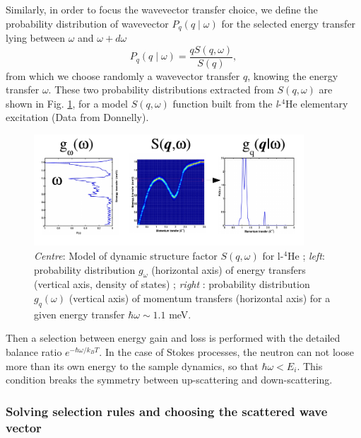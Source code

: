 Similarly, in order to focus the wavevector transfer choice, we define the probability distribution of wavevector $P_q(q\mid\omega)$ for the selected energy transfer lying between $\omega$ and $\omega+d\omega$
\begin{equation}
P_q(q\mid\omega) = \frac{q S(q, \omega)}{S(q)},
\end{equation}
from which we choose randomly a wavevector transfer $q$, knowing the energy transfer $\omega$.
These two probability distributions extracted from $S(q,\omega)$ are shown in Fig. \ref{f:isotropic-sqw-proba}, for a model $S(q,\omega)$ function built from the \textit{l}-$^4$He elementary excitation (Data from Donnelly).

\begin{figure}
  \begin{center}
    \includegraphics[width=0.9\textwidth]{figures/Sqw_sampling}
  \end{center}
\caption{\emph{Centre}: Model of dynamic structure factor $S(q,\omega)$ for l-$^4$He ; \emph{left}: probability distribution $g_\omega$ (horizontal axis) of energy transfers (vertical axis, density of states) ; \emph{right} : probability distribution $g_q(\omega)$ (vertical axis) of momentum transfers (horizontal axis) for a given energy transfer $\hbar \omega \sim 1.1$ meV.}
\label{f:isotropic-sqw-proba}
\end{figure}

Then a selection between energy gain and loss is performed with the detailed balance ratio $e^{-\hbar \omega / k_B T}$. In the case of Stokes processes, the neutron can not loose more than its own energy to the sample dynamics, so that $\hbar \omega < E_i$. This condition breaks the symmetry between up-scattering and down-scattering.

\subsubsection{Solving selection rules and choosing the scattered wave vector}
\label{s:rules-qw}

